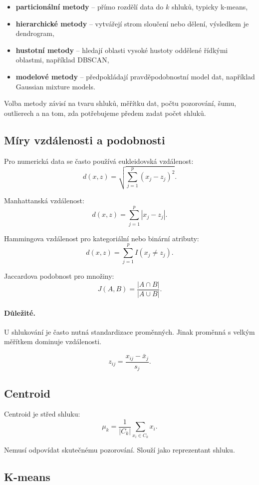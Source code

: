 \begin{itemize}
    \item \textbf{particionální metody} -- přímo rozdělí data do $k$ shluků, typicky k-means,
    \item \textbf{hierarchické metody} -- vytvářejí strom sloučení nebo dělení, výsledkem je dendrogram,
    \item \textbf{hustotní metody} -- hledají oblasti vysoké hustoty oddělené řídkými oblastmi, například
    DBSCAN,
    \item \textbf{modelové metody} -- předpokládají pravděpodobnostní model dat, například Gaussian mixture
    models.
\end{itemize}

Volba metody závisí na tvaru shluků, měřítku dat, počtu pozorování, šumu, outlierech a na tom, zda potřebujeme
předem zadat počet shluků.

\subsection{Míry vzdálenosti a podobnosti}

Pro numerická data se často používá eukleidovská vzdálenost:
\[
d(x,z)=
\sqrt{
\sum_{j=1}^p
(x_j-z_j)^2
}.
\]

Manhattanská vzdálenost:
\[
d(x,z)=
\sum_{j=1}^p
|x_j-z_j|.
\]

Hammingova vzdálenost pro kategoriální nebo binární atributy:
\[
d(x,z)=
\sum_{j=1}^p
I(x_j\neq z_j).
\]

Jaccardova podobnost pro množiny:
\[
J(A,B)=
\frac{|A\cap B|}
{|A\cup B|}.
\]

\paragraph{Důležité.}
U shlukování je často nutná standardizace proměnných. Jinak proměnná s velkým měřítkem dominuje vzdálenosti.

\[
z_{ij}=
\frac{x_{ij}-\bar{x}_j}{s_j}.
\]

\subsection{Centroid}

Centroid je střed shluku:
\[
\mu_k
=
\frac{1}{|C_k|}
\sum_{x_i\in C_k}
x_i.
\]

Nemusí odpovídat skutečnému pozorování. Slouží jako reprezentant shluku.

\subsection{K-means}

